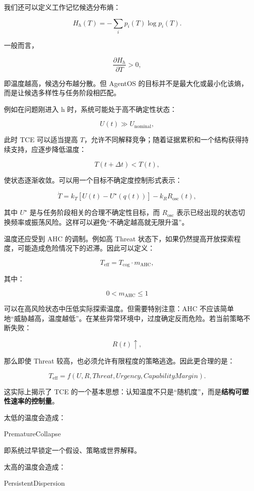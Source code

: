 我们还可以定义工作记忆候选分布熵：

\[
H_h(T)
=
-
\sum_i p_i(T)\log p_i(T).
\]

一般而言，

\[
\frac{\partial H_h}{\partial T}>0,
\]

即温度越高，候选分布越分散。但 AgentOS 的目标并不是最大化或最小化该熵，而是让候选多样性与任务阶段相匹配。

例如在问题刚进入 h 时，系统可能处于高不确定性状态：

\[
U(t)\gg U_{\mathrm{nominal}},
\]

此时 TCE 可以适当提高 $T$，允许不同解释竞争；随着证据累积和一个结构获得持续支持，应逐步降低温度：

\[
T(t+\Delta t)<T(t),
\]

使状态逐渐收敛。可以用一个目标不确定度控制形式表示：

\[
\dot T
=
k_T
\left[
U(t)-U^\star(q(t))
\right]
-
k_R R_{\mathrm{osc}}(t),
\]

其中 $U^\star$ 是与任务阶段相关的合理不确定性目标，而 $R_{\mathrm{osc}}$ 表示已经出现的状态切换频率或振荡风险。这样可以避免“不确定越高就无限升温”。

温度还应受到 AHC 的调制。例如高 Threat 状态下，如果仍然提高开放探索程度，可能造成危险情况下的迟滞。因此可以定义：

\[
T_{\mathrm{eff}}
=
T_{\mathrm{cog}}
\cdot
m_{\mathrm{AHC}},
\]

其中：

\[
0<m_{\mathrm{AHC}}\le 1
\]

可以在高风险状态中压低实际探索温度。但需要特别注意：AHC 不应该简单地“威胁越高，温度越低”。在某些异常环境中，过度确定反而危险。若当前策略不断失败：

\[
R(t)\uparrow,
\]

那么即使 Threat 较高，也必须允许有限程度的策略逃逸。因此更合理的是：

\[
T_{\mathrm{eff}}
=
f(
U,
R,
Threat,
Urgency,
CapabilityMargin
).
\]

这实际上揭示了 TCE 的一个基本思想：认知温度不只是“随机度”，而是\textbf{结构可塑性速率的控制量}。

太低的温度会造成：

\begin{statementbox}
PrematureCollapse
\end{statementbox}

即系统过早锁定一个假设、策略或世界解释。

太高的温度会造成：

\begin{statementbox}
PersistentDispersion
\end{statementbox}

